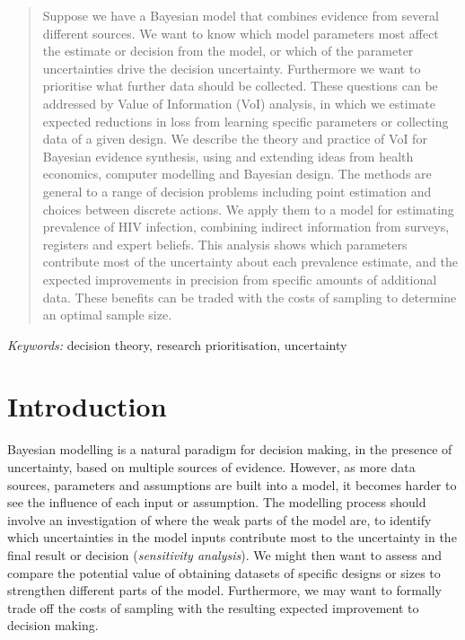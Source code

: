 \documentclass[12pt]{article}\usepackage[]{graphicx}\usepackage[]{color}
\begin{document}
\begin{abstract} %
  Suppose we have a Bayesian model that combines evidence from several different sources.  We want to know which model parameters most affect the estimate or decision from the model, or which of the parameter uncertainties drive the decision uncertainty.   Furthermore we want to prioritise what further data should be collected.    These questions can be addressed by Value of Information (VoI) analysis, in which we estimate expected reductions in loss from learning specific parameters or collecting data of a given design.  We describe the theory and practice of VoI for Bayesian evidence synthesis, using and extending ideas from health economics, computer modelling and Bayesian design.    The methods are general to a range of decision problems including point estimation and choices between discrete actions.  We apply them to a model for estimating prevalence of HIV infection, combining indirect information from surveys, registers and expert beliefs.  This analysis shows which parameters contribute most of the uncertainty about each prevalence estimate, and the expected improvements in precision from specific amounts of additional data.  These benefits can be traded with the costs of sampling to determine an optimal sample size.
\end{abstract}

\noindent%
{\it Keywords:}  decision theory, research prioritisation, uncertainty %
\vfill

\newpage
{} %
\section{Introduction}
\label{sec:intro}

Bayesian modelling is a natural paradigm for decision making, in the presence of uncertainty, based on multiple sources of evidence.  However, as more data sources, parameters and assumptions are built into a model, it becomes harder to see the influence of each input or assumption.  The modelling process should involve an investigation of where the weak parts of the model are, to identify which uncertainties in the model inputs contribute most to the uncertainty in the final result or decision (\emph{sensitivity analysis}).  We might then want to assess and compare the potential value of obtaining datasets of specific designs or sizes to strengthen different parts of the model.  Furthermore, we may want to formally trade off the costs of sampling with the resulting expected improvement to decision making.   
\end{document}
